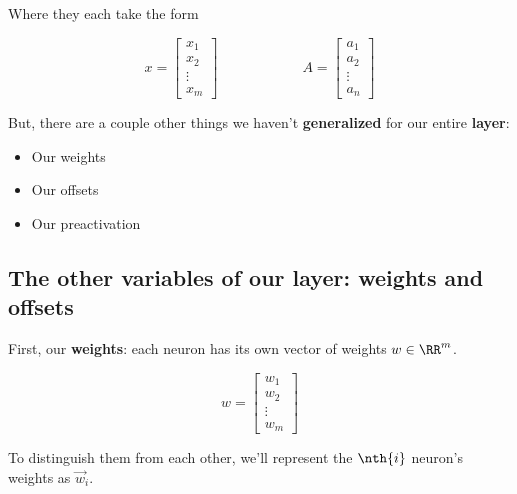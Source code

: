         Where they each take the form
        
        \begin{equation}
            x = 
                \begin{bmatrix}
                  x_1\\x_2\\ \vdots \\ x_m
                \end{bmatrix}
            \qquad \qquad \qquad
            A =
            \begin{bmatrix}
                a_1\\a_2\\ \vdots \\ a_n
            \end{bmatrix}
        \end{equation}
        
        But, there are a couple other things we haven't \textbf{generalized} for our entire \textbf{layer}:
        
        \begin{itemize}
            \item Our weights 
            \item Our offsets
            \item Our preactivation
        \end{itemize}
        
        \subsection{The other variables of our layer: weights and offsets}
        
        First, our \textbf{weights}: each neuron has its own vector of weights $w \in \RR^m$.
            
        \begin{equation}
            w = 
            \begin{bmatrix}
              w_1\\w_2\\ \vdots \\ w_m
            \end{bmatrix}
        \end{equation}
        
        To distinguish them from each other, we'll represent the $\nth{i}$ neuron's weights as $\vec{w}_i$.
        
